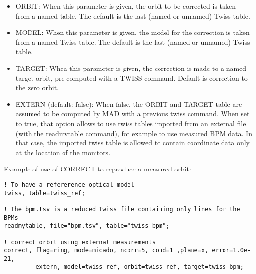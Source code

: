 \begin{itemize}
   \item ORBIT: When this parameter is given, the orbit to be corrected
     is taken from a named table. The default is the last (named or
     unnamed) Twiss table.  

   \item MODEL: When this parameter is given, the model for the
     correction is taken from a named Twiss table. The default is the
     last (named or unnamed) Twiss table.  

   \item TARGET: When this parameter is given, the correction is made to
     a named target orbit, pre-computed with a TWISS command. Default is
     correction to the zero orbit.  

   \item EXTERN (default: false): When false, the ORBIT and TARGET table
     are assumed to be computed by MAD with a previous twiss
     command. When set to true, that option allows to use twiss tables
     imported from an external file (with the readmytable command), for
     example to use measured BPM data. In that case, the imported twiss
     table is allowed to contain coordinate data only at the location of
     the monitors.  
\end{itemize}

Example of use of CORRECT to reproduce a measured orbit: 
\begin{verbatim}
! To have a refererence optical model
twiss, table=twiss_ref;

! The bpm.tsv is a reduced Twiss file containing only lines for the BPMs
readmytable, file="bpm.tsv", table="twiss_bpm";

! correct orbit using external measurements
correct, flag=ring, mode=micado, ncorr=5, cond=1 ,plane=x, error=1.0e-21,
         extern, model=twiss_ref, orbit=twiss_ref, target=twiss_bpm; 
\end{verbatim}


